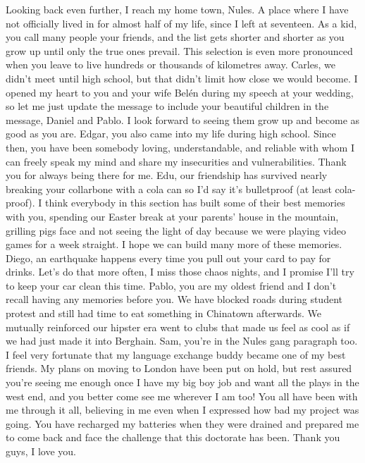 Looking back even further, I reach my home town, Nules. A place where I have not officially lived in for almost half of my life, since I left at seventeen. As a kid, you call many people your friends, and the list gets shorter and shorter as you grow up until only the true ones prevail. This selection is even more pronounced when you leave to live hundreds or thousands of kilometres away. Carles, we didn't meet until high school, but that didn't limit how close we would become. I opened my heart to you and your wife Belén during my speech at your wedding, so let me just update the message to include your beautiful children in the message, Daniel and Pablo. I look forward to seeing them grow up and become as good as you are. Edgar, you also came into my life during high school. Since then, you have been somebody loving, understandable, and reliable with whom I can freely speak my mind and share my insecurities and vulnerabilities. Thank you for always being there for me. Edu, our friendship has survived nearly breaking your collarbone with a cola can so I'd say it's bulletproof (at least cola-proof). I think everybody in this section has built some of their best memories with you, spending our Easter break at your parents' house in the mountain, grilling pigs face and not seeing the light of day because we were playing video games for a week straight. I hope we can build many more of these memories. Diego, an earthquake happens every time you pull out your card to pay for drinks. Let's do that more often, I miss those chaos nights, and I promise I'll try to keep your car clean this time. Pablo, you are my oldest friend and I don't recall having any memories before you. We have blocked roads during student protest and still had time to eat something in Chinatown afterwards. We mutually reinforced our hipster era went to clubs that made us feel as cool as if we had just made it into Berghain. Sam, you're in the Nules gang paragraph too. I feel very fortunate that my language exchange buddy became one of my best friends. My plans on moving to London have been put on hold, but rest assured you're seeing me enough once I have my big boy job and want all the plays in the west end, and you better come see me wherever I am too! You all have been with me through it all, believing in me even when I expressed how bad my project was going. You have recharged my batteries when they were drained and prepared me to come back and face the challenge that this doctorate has been. Thank you guys, I love you. 

